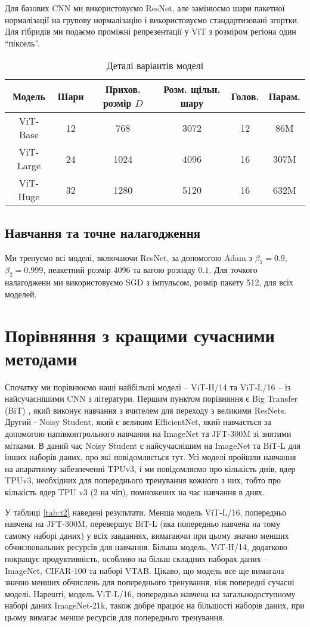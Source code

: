 Для базових CNN ми використовуємо ResNet,
але замінюємо шари пакетної нормалізації
на групову нормалізацію і використовуємо стандартизовані згортки.
Для гібридів ми подаємо проміжні репрезентації у ViT з
розміром регіона один ``піксель''.

\begin{table}[H]
    \caption{Деталі варіантів моделі}
    \begin{tabular}{ c c c c c c }
        \hline
        Модель & Шари & Прихов. розмір $D$ & Розм. щільн. шару & Голов. & Парам.  \\ \hline
        ViT-Base & 12 & 768 & 3072 & 12 & 86M  \\ 
        ViT-Large & 24 & 1024 & 4096 & 16 & 307M  \\ 
        ViT-Huge & 32 & 1280 & 5120 & 16 & 632M  \\ \hline
    \end{tabular}
    \label{tab:t1}
\end{table}

\subsection{Навчання та точне налагодження}
Ми тренуємо всі моделі, включаючи ResNet, за допомогою Adam
з $\beta_1 = 0.9$, $\beta_2 = 0.999$, пеакетний розмір 4096 та вагою розпаду
$0.1$. Для точкого налагодженн ми використовуємо SGD з імпульсом,
розмір пакету 512, для всіх моделей.

\section{Порівняння з кращими сучасними методами}
Спочатку ми порівнюємо наші найбільші моделі 
-- ViT-H/14 та ViT-L/16 --
із найсучаснішими CNN з літератури. Першим пунктом порівняння є
Big Transfer (BiT) \cite{big-transfer}, який виконує навчання
з вчителем для переходу з великими ResNets.
Другий - Noisy Student, який є великим EfficientNet, який навчається
за допомогою напівконтрольного навчання на ImageNet та JFT-300M зі
знятими мітками. В даний час Noisy Student є найсучаснішим на
ImageNet та BiT-L для інших наборів даних, про які повідомляється тут.
Усі моделі пройшли навчання на апаратному забезпеченні TPUv3,
і ми повідомляємо про кількість днів, ядер TPUv3, необхідних
для попереднього тренування кожного з них, тобто про
кількість ядер TPU v3 (2 на чіп), помножених на час навчання в днях.

У таблиці \ref{tab:t2} наведені результати.
Менша модель ViT-L/16, попередньо навчена на JFT-300M,
перевершує BiT-L (яка попередньо навчена на тому самому наборі даних)
у всіх завданнях, вимагаючи при цьому значно менших обчислювальних
ресурсів для навчання. Більша модель, ViT-H/14, додатково покращує
продуктивність, особливо на більш складних наборах даних
-- ImageNet, CIFAR-100 та наборі VTAB. Цікаво, що модель все ще
вимагала значно менших обчислень для попереднього тренування,
ніж попередні сучасні моделі. Нарешті, модель ViT-L/16, попередньо
навчена на загальнодоступному наборі даних ImageNet-21k, також
добре працює на більшості наборів даних, при цьому вимагає 
менше ресурсів для попередньго тренування.

